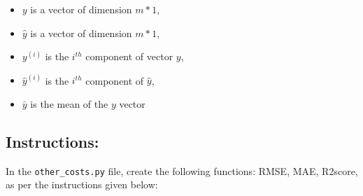 \documentclass[]{article}
\begin{document}
\begin{itemize}
\item
  \(y\) is a vector of dimension \(m * 1\),
\item
  \(\hat{y}\) is a vector of dimension \(m * 1\),
\item
  \(y^{(i)}\) is the \(i^{th}\) component of vector \(y\),
\item
  \(\hat{y}^{(i)}\) is the \(i^{th}\) component of \(\hat{y}\),
\item
  \(\bar{y}\) is the mean of the \(y\) vector
\end{itemize}

\hypertarget{instructions-7}{%
\subsection{Instructions:}\label{instructions-7}}

In the \texttt{other\_costs.py} file, create the following functions:
RMSE, MAE, R2score, as per the instructions given below:
\end{document}
